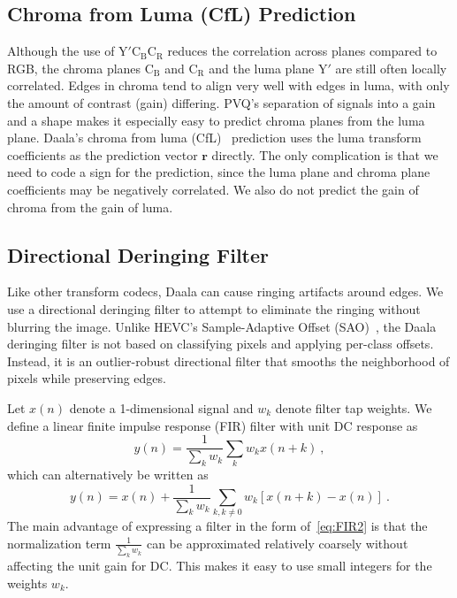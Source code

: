 \documentclass[english,conference,10pt]{IEEEtran}
\begin{document}
\subsection{Chroma from Luma (CfL) Prediction}
\label{sec:CFL}
Although the use of $\mathrm{Y'C_BC_R}$ reduces the correlation across planes
compared to RGB, the chroma planes $\mathrm{C_B}$ and $\mathrm{C_R}$ and the
luma plane $\mathrm{Y'}$ are still often locally correlated. Edges in
chroma tend to
align very well with edges in luma, with only the amount of contrast (gain) differing.
PVQ's separation of signals into a gain and a shape makes it especially easy
to predict chroma planes from the luma plane. Daala's chroma from luma (CfL)~\cite{egge2015spie}
prediction uses the luma transform coefficients as the prediction vector
$\mathbf{r}$ directly. The only complication is that we need to code a sign for the prediction,
since the luma plane and chroma plane coefficients may be negatively correlated.
We also do not predict the gain of chroma from the gain of luma.


\subsection{Directional Deringing Filter}
\label{sec:deringing}

Like other transform codecs, Daala can cause ringing artifacts around edges.
We use a directional deringing filter to attempt to eliminate the ringing without
blurring the image. Unlike HEVC's Sample-Adaptive Offset (SAO)~\cite{HEVC-SAO},
the Daala deringing filter is not based on classifying pixels and applying per-class
offsets. Instead, it is an outlier-robust directional filter that smooths the
neighborhood of pixels while preserving edges.

Let $x\left(n\right)$ denote a 1-dimensional signal and $w_{k}$
denote filter tap weights. We define a linear finite impulse response (FIR)
filter with unit DC response as
\begin{equation}
y\left(n\right)=\frac{1}{\sum_{k}w_{k}}\sum_{k}w_{k}x\left(n+k\right)\ ,\label{eq:FIR1}
\end{equation}
which can alternatively be written as
\begin{equation}
y\left(n\right)=x\left(n\right)+\frac{1}{\sum_{k}w_{k}}\sum_{k,k\neq0}w_{k}\left[x\left(n+k\right)-x\left(n\right)\right]\ .\label{eq:FIR2}
\end{equation}
The main advantage of expressing a filter in the form of~\cref{eq:FIR2}
is that the normalization term $\frac{1}{\sum_{k}w_{k}}$ can be approximated
relatively coarsely without affecting the unit gain for DC\@. This makes
it easy to use small integers for the weights $w_{k}$.
\end{document}
